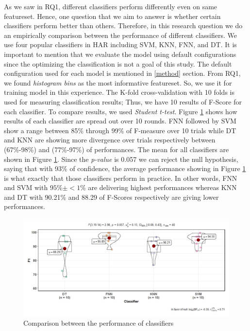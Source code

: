 \documentclass[journal,article,submit,moreauthors,pdftex]{Definitions/mdpi}
\begin{document}
As we saw in RQ1, different classifiers perform differently even on same featureset. Hence, one question that we aim to answer is whether certain classifiers perform better than others. Therefore, in this research question we do an empirically comparison between the performance of different classifiers. We use four popular classifiers in HAR including SVM, KNN, FNN, and DT. It is important to mention that we evaluate the model using default configurations since the optimizing the classification is not a goal of this study. The default configuration used for each model is mentioned in \ref{method} section. From RQ1, we found \textit{histogram bins} as the most informative featureset. So, we use it for training model in this experience. The K-fold cross-validation with 10 folds is used for measuring classification results; Thus, we have 10 results of F-Score for each classifier. To compare results, we used \textit{Student t-test}.
Figure \ref{fig:classification_comparison} shows how results of each classifier are spread out over 10 rounds. FNN followed by SVM show a range between 85\% through 99\% of F-measure over 10 trials while DT and KNN are showing more divergence over trials respectively between (67\%-98\%) and (77\%-97\%) of performances. The mean for all classifiers are shown in Figure \ref{fig:classification_comparison}. Since the \textit{p-value} is 0.057 we can reject the null hypothesis, saying that with 93\% of confidence, the average performance showing in Figure \ref{fig:classification_comparison} is what exactly that those classifiers perform in practice. In other words, FNN and SVM with $95\% \pm <1\% $ are delivering highest performances whereas KNN and DT with 90.21\% and 88.29 of F-Scores respectively are giving lower performances.
\begin{figure}[H]
	\centering
	\includegraphics[width=14 cm]{Definitions/images/F1_results_vioPlot.jpeg}
	\caption{Comparison between the performance of classifiers}
	\label{fig:classification_comparison}
\end{figure}
\end{document}
